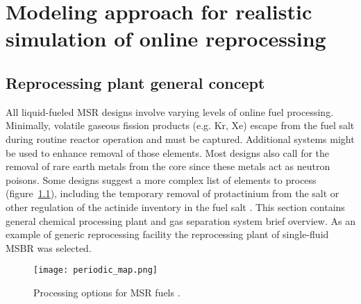 \chapter[Modeling approach for realistic simulation of online reprocessing]{Modeling approach for realistic simulation of online reprocessing}

\section{Reprocessing plant general concept}
All liquid-fueled \gls{MSR} designs involve varying levels of online fuel processing. Minimally, volatile gaseous fission products (e.g. Kr, Xe) escape from the fuel salt during routine reactor operation and must be captured. Additional systems might be used to enhance removal of those elements. Most designs also call for the removal of rare earth metals from the core since these metals act as neutron poisons. Some designs suggest a more complex list of elements to process (figure~\ref{fig:periodic_tab}), including the temporary removal of protactinium from the salt or other regulation of the actinide inventory in the fuel salt \cite{ahmad_neutronics_2015}. This section 
contains general chemical processing plant and gas separation system brief 
overview. As an example of generic reprocessing facility the reprocessing plant 
of single-fluid \gls{MSBR} was selected. 
\begin{figure}[htp!] %
  \centering
  \texttt{[image: periodic\_map.png]}
  \caption{Processing options for \gls{MSR} fuels \cite{ahmad_neutronics_2015}.}
  \label{fig:periodic_tab}
\end{figure}

